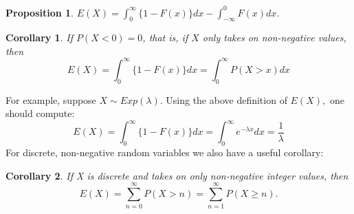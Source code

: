 \documentclass[12pt]{report} \addtolength{\textheight}{2in}
\newtheorem{cor}{Corollary}
\newtheorem{prop}{Proposition}
\begin{document}
\begin{prop}
$E(X)=\int_{0}^{\infty}\{1-F(x)\} dx - \int_{-\infty}^{0} F(x)dx$.  
\end{prop}
\begin{cor}
If $P(X<0)=0$, that is, if $X$ only takes on non-negative values, then
\begin{displaymath}
E(X)=\int_{0}^{\infty}\{ 1-F(x)\} dx= \int_{0}^{\infty} P(X>x) dx
\end{displaymath}
\end{cor}
For example, suppose $X\sim Exp (\lambda)$. Using the above definition of $E(X),$ one should compute:
\begin{displaymath}
E(X)=\int_{0}^{\infty} \{1-F(x)\} dx =\int_{0}^{\infty} e^{-\lambda x} dx =\frac{1}{\lambda}
\end{displaymath}
For discrete, non-negative random variables we also have a useful corollary:
\begin{cor}
If X is discrete and takes on only non-negative integer values, then
 \begin{displaymath}
 E(X)=\sum_{n=0}^{\infty} P(X > n) =\sum_{n=1}^{\infty} P(X \geq n).
 \end{displaymath}
 \end{cor}
\end{document}
